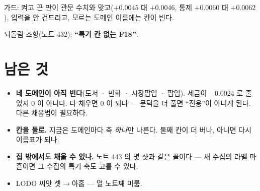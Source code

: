 \documentclass[11pt]{article}
\begin{document}
가드: 켜고 끈 판이 관문 수치와 맞고($+0.0045$ 대 $+0.0046$, 통제 $+0.0060$
대 $+0.0062$), 입력을 안 건드리고, 모르는 도메인 이름에는 칸이 빈다.

되돌림 조항(노트 432): \textbf{``특기 칸 없는 F18''}.

\section*{남은 것}

\begin{itemize}
\item \textbf{네 도메인이 아직 빈다}(도서 · 만화 · 시장팝업 · 팝업). 세금이
$-0.0024$ 로 줄었지 $0$ 이 아니다. 다 채우면 $0$ 이 되나 --- 문턱을 더
풀면 ``전용''이 아니게 된다. 다른 채움법이 필요하다.
\item \textbf{칸을 둘로.} 지금은 도메인마다 축 \emph{하나}만 나른다.
둘째 칸이 더 버나, 아니면 다시 이름표가 되나.
\item \textbf{집 밖에서도 채울 수 있나.} 노트 443 의 몇 샷과 같은
꼴이다 --- 새 수집의 라벨 마흔이면 그 수집의 특기 축도 고를 수 있다.
\item LODO 씨앗 셋$\to$아홉 --- 열 노트째 미룸.
\end{itemize}
\end{document}
